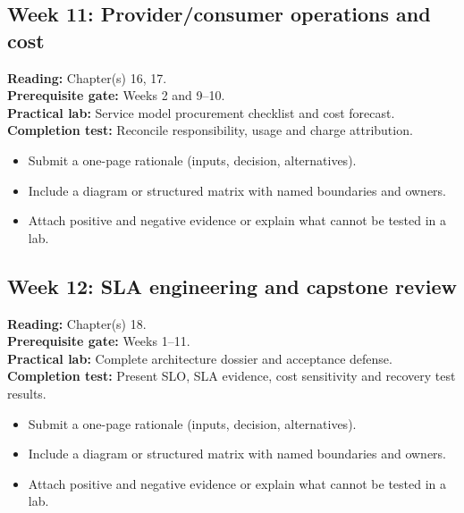 \documentclass[10pt,letterpaper]{article}
\begin{document}
\subsection{Week 11: Provider/consumer operations and cost}
\textbf{Reading:} Chapter(s) 16, 17.\\
\textbf{Prerequisite gate:} Weeks 2 and 9--10.\\
\textbf{Practical lab:} Service model procurement checklist and cost forecast.\\
\textbf{Completion test:} Reconcile responsibility, usage and charge attribution.
\begin{itemize}
\item Submit a one-page rationale (inputs, decision, alternatives).
\item Include a diagram or structured matrix with named boundaries and owners.
\item Attach positive and negative evidence or explain what cannot be tested in a lab.
\end{itemize}
\subsection{Week 12: SLA engineering and capstone review}
\textbf{Reading:} Chapter(s) 18.\\
\textbf{Prerequisite gate:} Weeks 1--11.\\
\textbf{Practical lab:} Complete architecture dossier and acceptance defense.\\
\textbf{Completion test:} Present SLO, SLA evidence, cost sensitivity and recovery test results.
\begin{itemize}
\item Submit a one-page rationale (inputs, decision, alternatives).
\item Include a diagram or structured matrix with named boundaries and owners.
\item Attach positive and negative evidence or explain what cannot be tested in a lab.
\end{itemize}
\end{document}
